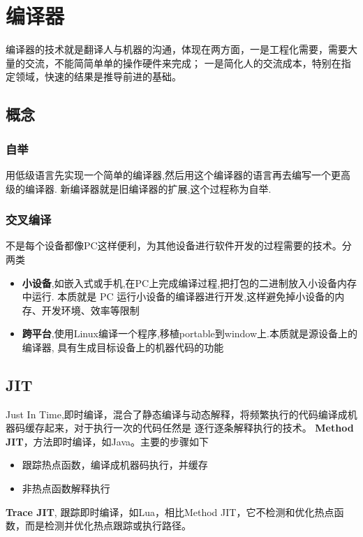 \chapter{编译器}
编译器的技术就是翻译人与机器的沟通，体现在两方面，一是工程化需要，需要大量的交流，不能简简单单的操作硬件来完成；
一是简化人的交流成本，特别在指定领域，快速的结果是推导前进的基础。

\section{概念}

\subsection{自举}
用低级语言先实现一个简单的编译器,然后用这个编译器的语言再去编写一个更高级的编译器.
新编译器就是旧编译器的扩展,这个过程称为自举.

\subsection{交叉编译}
不是每个设备都像PC这样便利，为其他设备进行软件开发的过程需要的技术。分两类
\begin{itemize}
    \item {\textbf{小设备},如嵌入式或手机,在PC上完成编译过程,把打包的二进制放入小设备内存中运行.
    本质就是 PC 运行小设备的编译器进行开发,这样避免掉小设备的内存、开发环境、效率等限制}
    \item {\textbf{跨平台},使用Linux编译一个程序,移植portable到window上.本质就是源设备上的编译器,
    具有生成目标设备上的机器代码的功能}
\end{itemize}

\section{JIT}
Just In Time,即时编译，混合了静态编译与动态解释，将频繁执行的代码编译成机器码缓存起来，对于执行一次的代码任然是
逐行逐条解释执行的技术。
\newline
\textbf{Method JIT}，方法即时编译，如Java。主要的步骤如下
\begin{itemize}
    \item {跟踪热点函数，编译成机器码执行，并缓存}
    \item {非热点函数解释执行}
\end{itemize}
\textbf{Trace JIT}, 跟踪即时编译，如Lua，相比Method JIT，它不检测和优化热点函数，而是检测并优化热点跟踪或执行路径。

